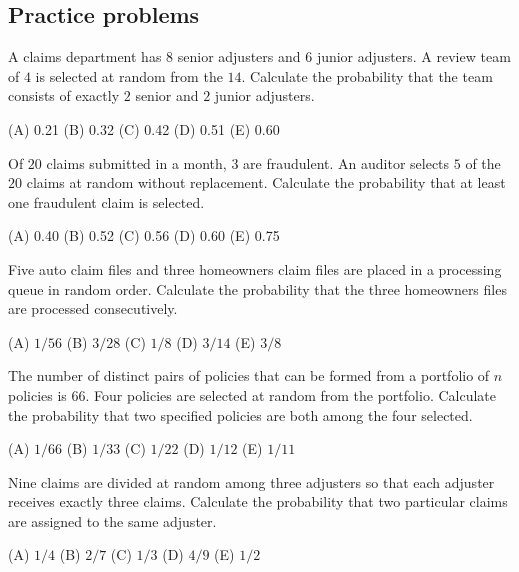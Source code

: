 \subsection{Practice problems}

\begin{practice}
A claims department has $8$ senior adjusters and $6$ junior adjusters. A review team of $4$ is
selected at random from the $14$. Calculate the probability that the team consists of exactly
$2$ senior and $2$ junior adjusters.
\par\smallskip\noindent (A) 0.21 \quad (B) 0.32 \quad (C) 0.42 \quad (D) 0.51 \quad (E) 0.60
\end{practice}

\begin{practice}
Of $20$ claims submitted in a month, $3$ are fraudulent. An auditor selects $5$ of the $20$
claims at random without replacement. Calculate the probability that at least one fraudulent
claim is selected.
\par\smallskip\noindent (A) 0.40 \quad (B) 0.52 \quad (C) 0.56 \quad (D) 0.60 \quad (E) 0.75
\end{practice}

\begin{practice}
Five auto claim files and three homeowners claim files are placed in a processing queue in
random order. Calculate the probability that the three homeowners files are processed
consecutively.
\par\smallskip\noindent (A) $1/56$ \quad (B) $3/28$ \quad (C) $1/8$ \quad (D) $3/14$ \quad (E) $3/8$
\end{practice}

\begin{practice}
The number of distinct pairs of policies that can be formed from a portfolio of $n$ policies
is $66$. Four policies are selected at random from the portfolio. Calculate the probability
that two specified policies are both among the four selected.
\par\smallskip\noindent (A) $1/66$ \quad (B) $1/33$ \quad (C) $1/22$ \quad (D) $1/12$ \quad (E) $1/11$
\end{practice}

\begin{practice}
Nine claims are divided at random among three adjusters so that each adjuster receives
exactly three claims. Calculate the probability that two particular claims are assigned to
the same adjuster.
\par\smallskip\noindent (A) $1/4$ \quad (B) $2/7$ \quad (C) $1/3$ \quad (D) $4/9$ \quad (E) $1/2$
\end{practice}

